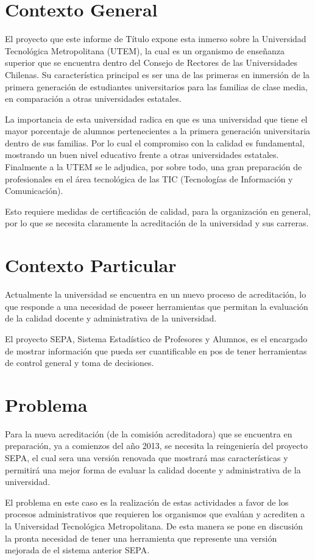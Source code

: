 \documentclass[a4paper,12pt,openany,oneside]{book}
\begin{document}
\section{Contexto General}
El proyecto que este informe de Título expone esta inmerso sobre la Universidad Tecnológica Metropolitana (UTEM), la cual es un organismo de enseñanza superior que se encuentra dentro del Consejo de Rectores de las Universidades Chilenas. Su característica principal es ser una de las primeras en inmersión de la primera generación de estudiantes universitarios para las familias de clase media, en comparación a otras universidades estatales.

La importancia de esta universidad radica en que es una universidad que tiene el mayor porcentaje de alumnos pertenecientes a la primera generación universitaria dentro de sus familias. Por lo cual el compromiso con la calidad es fundamental, mostrando un buen nivel educativo frente a otras universidades estatales. Finalmente a la UTEM se le adjudica, por sobre todo, una gran preparación de profesionales en el área tecnológica de las TIC (Tecnologías de Información y Comunicación).

Esto requiere medidas de certificación de calidad, para la organización en general, por lo que se necesita claramente la acreditación de la universidad y sus carreras.
\section{Contexto Particular}
Actualmente la universidad se encuentra en un nuevo proceso de acreditación, lo que responde a una necesidad de poseer herramientas que permitan la evaluación de la calidad docente y administrativa de la universidad.

El proyecto SEPA, Sistema Estadístico de Profesores y Alumnos, es el encargado de mostrar información que pueda ser cuantificable en pos de tener herramientas de control general y toma de decisiones.
\section{Problema}
Para la nueva acreditación (de la comisión acreditadora) que se encuentra en preparación, ya a comienzos del año 2013, se necesita la reingeniería del proyecto SEPA, el cual sera una versión renovada que mostrará mas características y permitirá una mejor forma de evaluar la calidad docente y administrativa de la universidad.

El problema en este caso es la realización de estas actividades a favor de los procesos administrativos que requieren los organismos que evalúan y acrediten a la Universidad Tecnológica Metropolitana. De esta manera se pone en discusión la pronta necesidad de tener una herramienta que represente una versión mejorada de el sistema anterior SEPA.
\end{document}
